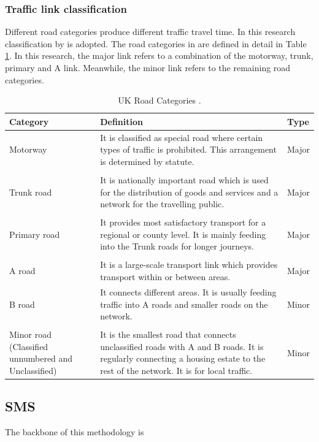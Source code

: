 \documentclass[journal]{IEEEtran}
\begin{document}
\subsubsection{Traffic link classification}
Different road categories produce different traffic travel time. In this research classification by \cite{DepartmentofTransport2012} is adopted.  The road categories in \cite{DepartmentofTransport2012} are defined in detail in Table \ref{table:roadcategories}. In this research, the major link refers to a combination of the motorway, trunk, primary and A link. Meanwhile, the minor link  refers to the remaining road categories.
\begin{table}[!t]
	\small
	\caption{UK Road Categories \cite{DepartmentofTransport2012}.}
	\label{table:roadcategories}
	\begin{tabular}{p{2cm}p{4.5cm}p{1.5cm}}
		\hline
		Category&		Definition&	Type\\
		\hline
		Motorway&	It is classified as special road where certain types of traffic is prohibited. This arrangement is determined by statute.&	Major\\
		&	&	\\
		Trunk road&	It is nationally important road which is used for the distribution of goods and services and a network for the travelling public.&	Major\\
		&	&	\\
		Primary road&	It provides most satisfactory transport for a regional or county level. It is mainly feeding into the Trunk roads for longer journeys.&	Major\\
		&	&	\\
		A road&	It is a large-scale transport link which provides transport within or between areas.& Major\\
		\hline
		B road&	It connects different areas. It is usually feeding traffic into A roads and smaller roads on the network.&	Minor\\
		&	&	\\
		Minor road (Classified unnumbered and Unclassified)& It is the smallest road that connects unclassified roads with A and B roads. It is regularly connecting a housing estate to the rest of the network. It is for local traffic.&	Minor\\
		\hline
	\end{tabular}
\end{table}


\subsection{SMS}
The backbone of this methodology is 
\end{document}
